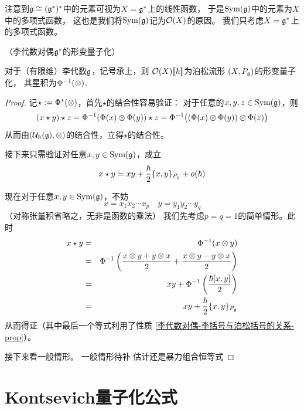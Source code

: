 注意到$\mathfrak{g}\cong(\mathfrak{g}^*)^*$中的元素可视为$X=\mathfrak{g}^*$上的线性函数，
于是$\operatorname{Sym}(\mathfrak{g})$中的元素为$X$中的多项式函数，
这也是我们将$\operatorname{Sym}(\mathfrak{g})$记为$\mathcal{O}(X)$的原因。
我们只考虑$X=\mathfrak{g}^*$上的多项式函数。


\begin{Example}（李代数对偶$\mathfrak{g}^*$的形变量子化）

对于（有限维）李代数$\mathfrak{g}$，记号承上，则
$\mathcal{O}(X)[\![\hbar]\!]$为泊松流形
$(X,P_{\mathfrak{g}})$的形变量子化，
其星积为$\Phi^{-1}(\otimes)$.
\end{Example}

\begin{proof}
记$\star:=\Phi^*(\otimes)$，首先$\star$的结合性容易验证：
对于任意的$x,y,z\in\operatorname{Sym}(\mathfrak{g})$，则
\begin{eqnarray*}
(x\star y)\star z=\Phi^{-1}(\Phi(x)\otimes\Phi(y))\star z
=\Phi^{-1}\big((\Phi(x)\otimes\Phi(y))\otimes \Phi(z)\big)
\end{eqnarray*}
从而由$(\mathcal{U}_{\hbar}(\mathfrak{g}),\otimes)$的结合性，立得$\star$的结合性。

接下来只需验证对任意$x,y\in\operatorname{Sym}(\mathfrak{g})$，成立
$$x\star y=xy+\frac{\hbar}{2}\{x,y\}_{P_{\mathfrak{g}}}+o(\hbar)$$

现在对于任意$x,y\in\operatorname{Sym}(\mathfrak{g})$，不妨
$$x=x_1x_2\cdots x_p\quad y=y_1y_2\cdots y_q$$
（对称张量积省略之，无非是函数的乘法）
我们先考虑$p=q=1$的简单情形。此时
\begin{eqnarray*}
     x\star y
&=&
     \Phi^{-1}
     (x\otimes y)\\
&=&
     \Phi^{-1}
     \left(
       \frac{x\otimes y+ y\otimes x}{2}
      +\frac{x\otimes y- y\otimes x}{2}
     \right)\\
&=&
    xy+\Phi^{-1}
    \left(
      \frac{\hbar[x,y]}{2}
    \right)\\
&=&
    xy+\frac{\hbar}{2}\{x,y\}_{P_{\mathfrak{g}}}
\end{eqnarray*}
从而得证（其中最后一个等式利用了性质
\ref{李代数对偶-李括号与泊松括号的关系-prop}）。

接下来看一般情形。
{\color{red}
一般情形待补
\color{blue}
估计还是暴力组合恒等式}
\end{proof}


\section{Kontsevich量子化公式}

